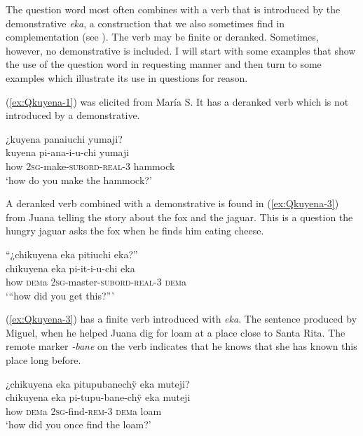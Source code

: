 The question word most often combines with a verb that is introduced by the demonstrative \textit{eka}, a construction that we also sometimes find in complementation (see ). The verb may be finite or deranked. Sometimes, however, no demonstrative is included.  I will start with some examples that show the use of the question word in requesting manner and then turn to some examples which illustrate its use in questions for reason.

(\ref{ex:Qkuyena-1}) was elicited from María S. It has a deranked verb which is not introduced by a demonstrative.


\ea\label{ex:Qkuyena-1}
\begingl
\glpreamble ¿kuyena panaiuchi yumaji?\\
\gla kuyena pi-ana-i-u-chi yumaji\\
\glb how 2\textsc{sg}-make-\textsc{subord}-\textsc{real}-3 hammock\\
\glft ‘how do you make the hammock?’
\endgl
\trailingcitation{[rxx-e181022le]}
\xe

A deranked verb combined with a demonstrative is found in (\ref{ex:Qkuyena-3}) from Juana telling the story about the fox and the jaguar. This is a question the hungry jaguar asks the fox when he finds him eating cheese.

\ea\label{ex:Qkuyena-3}
\begingl
\glpreamble “¿chikuyena eka pitiuchi eka?” \\
\gla chikuyena eka pi-it-i-u-chi eka\\
\glb how \textsc{dem}a 2\textsc{sg}-master-\textsc{subord}-\textsc{real}-3 \textsc{dem}a\\
\glft ‘“how did you get this?”’
\endgl
\trailingcitation{[jmx-n120429ls-x5.245-246]}
\xe

(\ref{ex:Qkuyena-3}) has a finite verb introduced with \textit{eka}. The sentence produced by Miguel, when he helped Juana dig for loam at a place close to Santa Rita. The remote marker \textit{-bane} on the verb indicates that he knows that she has known this place long before.

\ea\label{ex:Qkuyena-2}
\begingl
\glpreamble ¿chikuyena eka pitupubanechÿ eka muteji? \\
\gla chikuyena eka pi-tupu-bane-chÿ eka muteji\\
\glb how \textsc{dem}a 2\textsc{sg}-find-\textsc{rem}-3 \textsc{dem}a loam\\
\glft ‘how did you once find the loam?’
\endgl
\trailingcitation{[jmx-d110918ls-1.013]}
\xe

